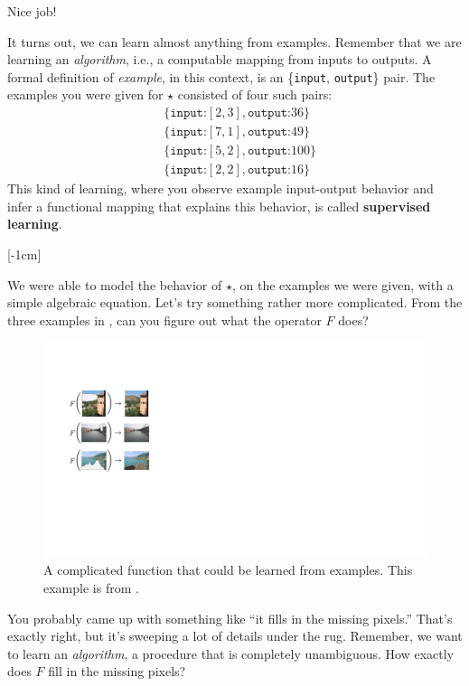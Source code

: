 Nice job!

It turns out, we can learn almost anything from examples. 
Remember that we are learning an \emph{algorithm}, i.e., a computable mapping from inputs to outputs. A formal definition of \emph{example}, in this context, is an \{\texttt{input}, \texttt{output}\} pair. The examples you were given for $\star$ consisted of four such pairs:
\begin{align}
    &\{\texttt{input:} [2,3], \texttt{output:} 36\}\nonumber \\
    &\{\texttt{input:} [7,1], \texttt{output:} 49\}\nonumber \\
    &\{\texttt{input:} [5,2], \texttt{output:} 100\}\nonumber \\
    &\{\texttt{input:} [2,2], \texttt{output:}16\}\nonumber
\end{align}
This kind of learning, where you observe example input-output behavior and infer a functional mapping that explains this behavior, is called \textbf{supervised learning}. 

[-1cm]

We were able to model the behavior of $\star$, on the examples we were given, with a simple algebraic equation. Let's try something rather more complicated. From the three examples in \fig{\ref{fig:intro_to_learning:inpainting_example}}, can you figure out what the operator $F$ does?

\begin{figure}[h]
    \centerline{
    \includegraphics[width=0.4\linewidth]{./figures/intro_to_learning/inpainting_example.pdf}
    }
    \caption{A complicated function that could be learned from examples. This example is from \cite{hays2007scene}. }
    \label{fig:intro_to_learning:inpainting_example}
\end{figure}

You probably came up with something like ``it fills in the missing pixels.'' That's exactly right, but it's sweeping a lot of details under the rug. Remember, we want to learn an \emph{algorithm}, a procedure that is completely unambiguous. How exactly does $F$ fill in the missing pixels? 

